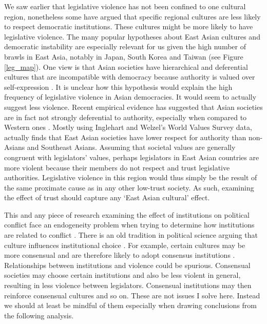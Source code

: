 \documentclass[a4paper]{article}\usepackage{graphicx, color}
\begin{document}
{We saw earlier that legislative violence has not been confined to one cultural region, nonetheless some have argued that specific regional cultures are less likely to respect democratic institutions. These cultures might be more likely to have legislative violence. The many popular hypotheses about East Asian cultures and democratic instability are especially relevant for us given the high number of brawls in East Asia, notably in Japan, South Korea and Taiwan (see Figure \ref{leg_map}). One view is that Asian societies have hierarchical and deferential cultures that are incompatible with democracy because authority is valued over self-expression \citep[see][212-213 for a discussion]{Dalton2005}. It is unclear how this hypothesis would explain the high frequency of legislative violence in Asian democracies. It would seem to actually suggest less violence. Recent empirical evidence has suggested that Asian societies are in fact not strongly deferential to authority, especially when compared to Western ones \citep{Dalton2005, KimAsianValues2010}. Mostly using Inglehart and Welzel's World Values Survey data, \cite{KimAsianValues2010} actually finds that East Asian societies have lower respect for authority than non-Asians and Southeast Asians. Assuming that societal values are generally congruent with legislators' values, perhaps legislators in East Asian countries are more violent because their members do not respect and trust legislative authorities. Legislative violence in this region would thus simply be the result of the same proximate cause as in any other low-trust society. As such, examining the effect of trust should capture any `East Asian cultural' effect. 

This and any piece of research examining the effect of institutions on political conflict face an endogeneity problem when trying to determine how institutions are related to conflict \citep[][751]{Carey2000}. There is an old tradition in political science \citep[][528--529]{Frye1997} arguing that culture influences institutional choice \citep[in particular see][]{Almond1963}. For example, certain cultures may be more consensual and are therefore likely to adopt consensus institutions \citep[][22-23]{Lijphart2003}. Relationships between institutions and violence could be spurious. Consensual societies may choose certain institutions and also be less violent in general, resulting in less violence between legislators. Consensual institutions may then reinforce consensual cultures and so on. These are not issues I solve here. Instead we should at least be mindful of them especially when drawing conclusions from the following analysis.

}
\end{document}

